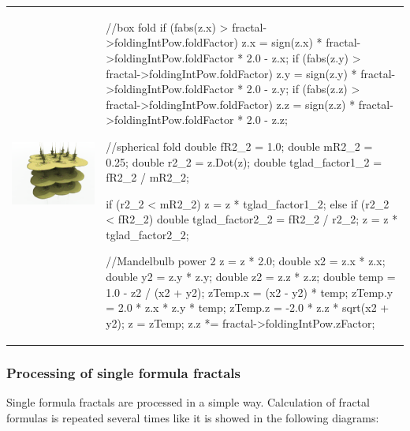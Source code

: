\begin{tabular}{l l}
	\includegraphics[width=0.3\linewidth]{img/manual/media/formula_box_fold_pwr2.png}	
	& 
	\begin{minipage}[b]{0.5\linewidth}
		\begin{cppcode}
//box fold
if (fabs(z.x) > fractal->foldingIntPow.foldFactor)
	z.x = sign(z.x) * fractal->foldingIntPow.foldFactor
		 * 2.0 - z.x;
if (fabs(z.y) > fractal->foldingIntPow.foldFactor)
	z.y = sign(z.y) * fractal->foldingIntPow.foldFactor
		 * 2.0 - z.y;
if (fabs(z.z) > fractal->foldingIntPow.foldFactor)
	z.z = sign(z.z) * fractal->foldingIntPow.foldFactor
		 * 2.0 - z.z;

//spherical fold
double fR2_2 = 1.0;
double mR2_2 = 0.25;
double r2_2 = z.Dot(z);
double tglad_factor1_2 = fR2_2 / mR2_2;

if (r2_2 < mR2_2)
{
	z = z * tglad_factor1_2;
}
else if (r2_2 < fR2_2)
{
	double tglad_factor2_2 = fR2_2 / r2_2;
	z = z * tglad_factor2_2;
}

//Mandelbulb power 2
z = z * 2.0;
double x2 = z.x * z.x;
double y2 = z.y * z.y;
double z2 = z.z * z.z;
double temp = 1.0 - z2 / (x2 + y2);
zTemp.x = (x2 - y2) * temp;
zTemp.y = 2.0 * z.x * z.y * temp;
zTemp.z = -2.0 * z.z * sqrt(x2 + y2);
z = zTemp;
z.z *= fractal->foldingIntPow.zFactor;
		\end{cppcode}
	\end{minipage}
\end{tabular} 

\subsubsection{Processing of single formula fractals}

Single formula fractals are processed in a simple way. Calculation of fractal
formulas is repeated several times like it is showed in the following
diagrams:\nolinebreak \nopagebreak

